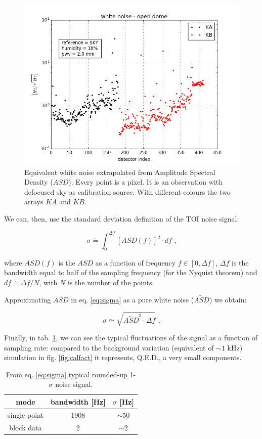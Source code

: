 \documentclass[twocolumn,traditabstract]{aa}\\
\begin{document}
\begin{figure}[htf]
	\centering
	\includegraphics[width=.5\textwidth]{4.results/white_noise_index.png}
	\caption{Equivalent white noise extrapolated from Amplitude Spectral Density ($ASD$). Every point is a pixel. It is an observation with defocused sky as calibration source. With different colours the two arrays $KA$ and $KB$.}
	\label{fig:ASD}
\end{figure}

\noindent  We can, then, use the standard deviation definition of the TOI noise signal:

\begin{equation}
\sigma \doteq \int_{0}^{\Delta f} \left[ASD(f) \right]^2\cdot df \text{ ,}
\label{eq:sigma}
\end{equation}

\noindent where $ASD(f)$ is the $ASD$ as a function of frequency $f\in[0,\Delta f]$, $\Delta f$ is the bandwidth equal to half of the sampling frequency (for the Nyquist theorem) and $df\doteq\Delta f/N$, with $N$ is the number of the points.

\noindent Approximating $ASD$ in eq. \ref{eq:sigma} as a pure white noise ($\tilde{ASD}$) we obtain:

\begin{equation}
\sigma\simeq \sqrt{ \tilde{ASD}^2 \cdot \Delta f } \text{ ,}
\end{equation}

\noindent Finally, in tab. \ref{tab:sigma_sig}, we can see the typical fluctuations of the signal as a function of sampling rate: compared to the background variation (equivalent of $\sim 1$ kHz) simulation in fig. \ref{fig:calfact} it represents, Q.E.D., a very small components.

\begin{table}[htf]
	\footnotesize
	\centering
	\caption{From eq. \ref{eq:sigma} typical rounded-up 1-$\sigma$ noise signal.}
	\begin{tabular}{ccc}
		\toprule
		\textbf{mode} & \textbf{bandwidth [Hz]} & \textbf{$\sigma$ [Hz]} \\
		\toprule
		single point & 1908 & $\sim$50 \\ 
		\midrule 
		block data & 2 & $\sim$2 \\ 
		\bottomrule
	\end{tabular}
	\label{tab:sigma_sig}
\end{table}
\end{document}
